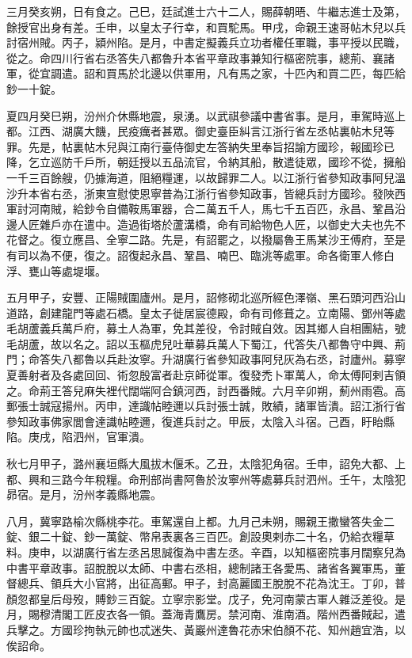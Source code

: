 \begin{pinyinscope}
 三月癸亥朔，日有食之。己巳，廷試進士六十二人，賜薛朝晤、牛繼志進士及第，餘授官出身有差。壬申，以皇太子行幸，和買駝馬。甲戌，命親王速哥帖木兒以兵討宿州賊。丙子，潁州陷。是月，中書定擬義兵立功者權任軍職，事平授以民職，從之。命四川行省右丞答失八都魯升本省平章政事兼知行樞密院事，總荊、襄諸軍，從宜調遣。詔和買馬於北邊以供軍用，凡有馬之家，十匹內和買二匹，每匹給鈔一十錠。



 夏四月癸巳朔，汾州介休縣地震，泉湧。以武祺參議中書省事。是月，車駕時巡上都。江西、湖廣大饑，民疫癘者甚眾。御史臺臣糾言江浙行省左丞帖裏帖木兒等罪。先是，帖裏帖木兒與江南行臺侍御史左答納失里奉旨招諭方國珍，報國珍已降，乞立巡防千戶所，朝廷授以五品流官，令納其船，散遣徒眾，國珍不從，擁船一千三百餘艘，仍據海道，阻絕糧運，以故歸罪二人。以江浙行省參知政事阿兒溫沙升本省右丞，浙東宣慰使恩寧普為江浙行省參知政事，皆總兵討方國珍。發陜西軍討河南賊，給鈔令自備鞍馬軍器，合二萬五千人，馬七千五百匹，永昌、鞏昌沿邊人匠雜戶亦在遣中。造過街塔於蘆溝橋，命有司給物色人匠，以御史大夫也先不花督之。復立應昌、全寧二路。先是，有詔罷之，以撥屬魯王馬某沙王傅府，至是有司以為不便，復之。詔復起永昌、鞏昌、喃巴、臨洮等處軍。命各衛軍人修白浮、甕山等處堤堰。



 五月甲子，安豐、正陽賊圍廬州。是月，詔修砌北巡所經色澤嶺、黑石頭河西沿山道路，創建龍門等處石橋。皇太子徙居宸德殿，命有司修葺之。立南陽、鄧州等處毛胡蘆義兵萬戶府，募土人為軍，免其差役，令討賊自效。因其鄉人自相團結，號毛胡蘆，故以名之。詔以玉樞虎兒吐華募兵萬人下蜀江，代答失八都魯守中興、荊門；命答失八都魯以兵赴汝寧。升湖廣行省參知政事阿兒灰為右丞，討廬州。募寧夏善射者及各處回回、術忽殷富者赴京師從軍。復發禿卜軍萬人，命太傅阿剌吉領之。命荊王答兒麻失裡代闊端阿合鎮河西，討西番賊。六月辛卯朔，薊州雨雹。高郵張士誠寇揚州。丙申，達識帖睦邇以兵討張士誠，敗績，諸軍皆潰。詔江浙行省參知政事佛家閭會達識帖睦邇，復進兵討之。甲辰，太陰入斗宿。己酉，盱眙縣陷。庚戌，陷泗州，官軍潰。



 秋七月甲子，潞州襄垣縣大風拔木偃禾。乙丑，太陰犯角宿。壬申，詔免大都、上都、興和三路今年稅糧。命刑部尚書阿魯於汝寧州等處募兵討泗州。壬午，太陰犯昴宿。是月，汾州孝義縣地震。



 八月，冀寧路榆次縣桃李花。車駕還自上都。九月己未朔，賜親王撒蠻答失金二錠、銀二十錠、鈔一萬錠、幣帛表裏各三百匹。創設奧剌赤二十名，仍給衣糧草料。庚申，以湖廣行省左丞呂思誠復為中書左丞。辛酉，以知樞密院事月闊察兒為中書平章政事。詔脫脫以太師、中書右丞相，總制諸王各愛馬、諸省各翼軍馬，董督總兵、領兵大小官將，出征高郵。甲子，封高麗國王脫脫不花為沈王。丁卯，普顏忽都皇后母歿，賻鈔三百錠。立寧宗影堂。戊子，免河南蒙古軍人雜泛差役。是月，賜穆清閣工匠皮衣各一領。蓋海青鷹房。禁河南、淮南酒。階州西番賊起，遣兵擊之。方國珍拘執元帥也忒迷失、黃巖州達魯花赤宋伯顏不花、知州趙宜浩，以俟詔命。




\end{pinyinscope}
